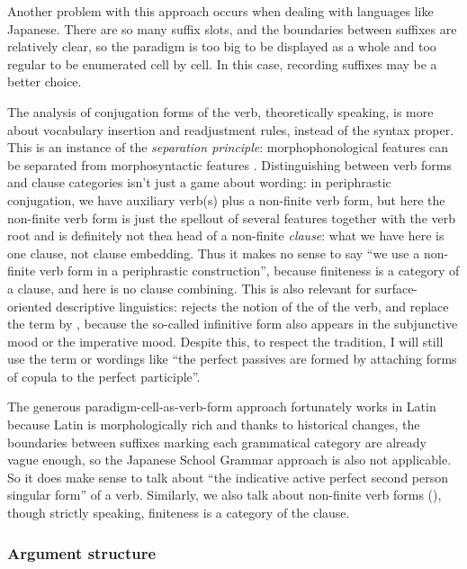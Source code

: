 {Another problem with this approach occurs 
when dealing with languages like Japanese.
There are so many suffix slots,
and the boundaries between suffixes are relatively clear,
so the paradigm is too big to be displayed as a whole
and too regular to be enumerated cell by cell.
In this case, recording suffixes may be a better choice.

The analysis of conjugation forms of the verb, theoretically speaking,
is more about vocabulary insertion and readjustment rules,
instead of the syntax proper.
This is an instance of the \emph{separation principle}:
morphophonological features can be separated from morphosyntactic features
\citep{embick2000features}.
Distinguishing between verb forms and clause categories isn't just a game about wording:
in periphrastic conjugation,
we have auxiliary verb(s) plus a non-finite verb form,
but here the non-finite verb form is just the spellout of several features together with the verb root 
and is definitely not thea head of a non-finite \emph{clause}:
what we have here is one clause, not clause embedding.
Thus it makes no sense to say ``we use a non-finite verb form in a periphrastic construction'',
because finiteness is a category of a clause,
and here is no clause combining.
This is also relevant for surface-oriented descriptive linguistics:
\citet[]{cgel} rejects the notion of the  of the verb,
and replace the term by ,
because the so-called infinitive form also appears in the subjunctive mood
or the imperative mood. 
Despite this, to respect the tradition, 
I will still use the term  
or wordings like ``the perfect passives are formed by attaching forms of copula to the perfect participle''.

The generous paradigm-cell-as-verb-form approach fortunately works in Latin 
because Latin is morphologically rich
and thanks to historical changes,
the boundaries between suffixes marking each grammatical category 
are already vague enough, so the Japanese School Grammar approach is also not applicable. 
So it does make sense to talk about 
``the indicative active perfect second person singular form'' of a verb.
Similarly, we also talk about non-finite verb forms (),
though strictly speaking, finiteness is a category of the clause.

\subsubsection{Argument structure}\label{sec:a-position}

}

